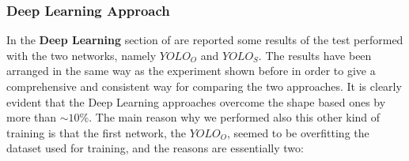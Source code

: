 %

\subsubsection{Deep Learning Approach}
In the \textbf{Deep Learning} section of  are reported some results of the test performed with the two networks, namely $YOLO_O$ and $YOLO_S$. The results have been arranged in the same way as the experiment shown before in order to give a comprehensive and consistent way for comparing the two approaches. It is clearly evident that the Deep Learning approaches overcome the shape based ones by more than $\sim10\%$. The main reason why we performed also this other kind of training is that the first network, the $YOLO_O$, seemed to be overfitting the dataset used for training, and the reasons are essentially two:

